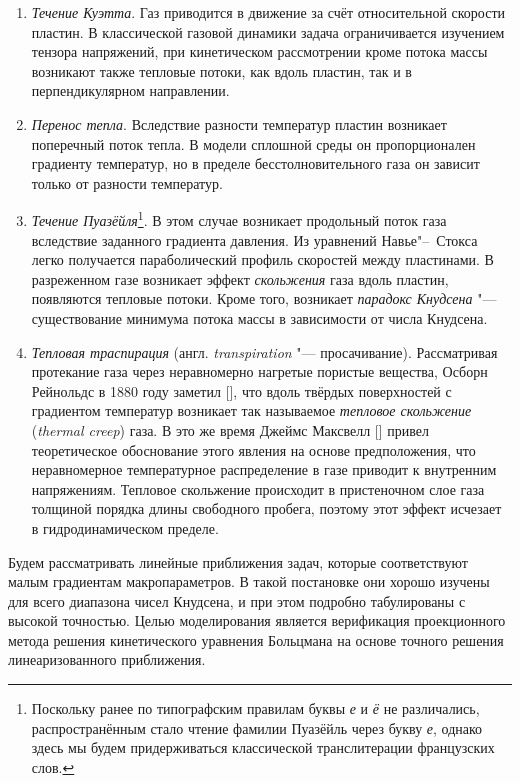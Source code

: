 \begin{enumerate}
	\item \textit{Течение Куэтта}. Газ приводится в движение за счёт относительной скорости пластин.
		В классической газовой динамики задача ограничивается изучением тензора напряжений,
		при кинетическом рассмотрении кроме потока массы возникают также тепловые потоки,
		как вдоль пластин, так и в перпендикулярном направлении.
	\item \textit{Перенос тепла}. Вследствие разности температур пластин возникает поперечный поток тепла.
		В модели сплошной среды он пропорционален градиенту температур,
		но в пределе бесстолновительного газа он зависит только от разности температур.
	\item \textit{Течение Пуазёйля}\footnote
		{
			Поскольку ранее по типографским правилам буквы \textit{е} и \textit{ё} не различались,
			распространённым стало чтение фамилии Пуазёйль через букву \textit{е}, однако здесь мы будем придерживаться
			классической транслитерации французских слов.
		}. В этом случае возникает продольный поток газа вследствие заданного градиента давления.
		Из уравнений Навье"--~Стокса легко получается параболический профиль скоростей между пластинами.
		В разреженном газе возникает эффект \textit{скольжения} газа вдоль пластин, появляются тепловые потоки.
		Кроме того, возникает \textit{парадокс Кнудсена} "--- существование минимума потока массы в зависимости от числа Кнудсена.
	\item \textit{Тепловая траспирация} (англ. \textit{transpiration} "--- просачивание).
		Рассматривая протекание газа через неравномерно нагретые пористые вещества, Осборн Рейнольдс в 1880 году заметил [],
		что вдоль твёрдых поверхностей с градиентом температур возникает так называемое \textit{тепловое скольжение} (\textit{thermal creep}) газа.
		В это же время Джеймс Максвелл [] привел теоретическое обоснование этого явления на основе предположения,
		что неравномерное температурное распределение в газе приводит к внутренним напряжениям.
		Тепловое скольжение происходит в пристеночном слое газа толщиной порядка длины свободного пробега,
		поэтому этот эффект исчезает в гидродинамическом пределе.
\end{enumerate}

Будем рассматривать линейные приближения задач, которые соответствуют малым градиентам макропараметров.
В такой постановке они хорошо изучены для всего диапазона чисел Кнудсена, и при этом подробно табулированы с высокой точностью.
Целью моделирования является верификация проекционного метода решения кинетического уравнения Больцмана
на основе точного решения линеаризованного приближения.

